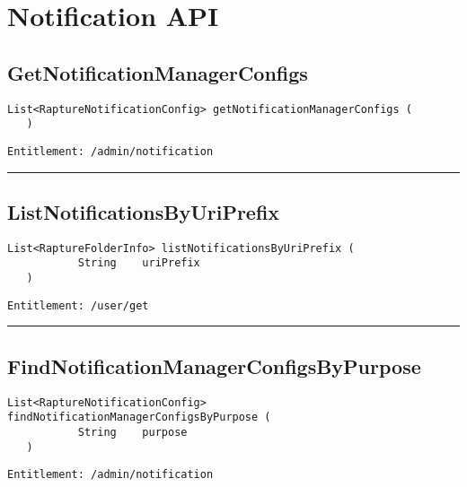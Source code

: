 \chapter{Notification API}

\section{GetNotificationManagerConfigs}
\label{Api:GetNotificationManagerConfigs}
\begin{lstlisting}[style=nonumbers]
   List<RaptureNotificationConfig> getNotificationManagerConfigs (
   )
\end{lstlisting}
\begin{Verbatim}[formatcom=\color{Maroon}]
  Entitlement: /admin/notification
\end{Verbatim}



\rule{12cm}{2pt}
\section{ListNotificationsByUriPrefix}
\label{Api:ListNotificationsByUriPrefix}
\begin{lstlisting}[style=nonumbers]
   List<RaptureFolderInfo> listNotificationsByUriPrefix (
           String    uriPrefix
   )
\end{lstlisting}
\begin{Verbatim}[formatcom=\color{Maroon}]
  Entitlement: /user/get
\end{Verbatim}



\rule{12cm}{2pt}
\section{FindNotificationManagerConfigsByPurpose}
\label{Api:FindNotificationManagerConfigsByPurpose}
\begin{lstlisting}[style=nonumbers]
   List<RaptureNotificationConfig> findNotificationManagerConfigsByPurpose (
           String    purpose
   )
\end{lstlisting}
\begin{Verbatim}[formatcom=\color{Maroon}]
  Entitlement: /admin/notification
\end{Verbatim}



